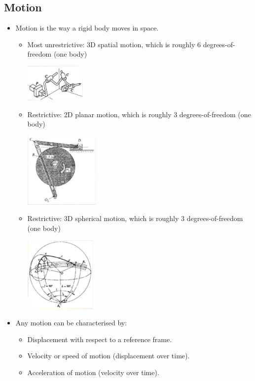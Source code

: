 \documentclass[11pt]{article}
\begin{document}
\subsection{Motion}
\label{sec:org8ee8455}
\begin{itemize}
\item Motion is the way a rigid body moves in space.
\begin{itemize}
\item Most unrestrictive: 3D spatial motion, which is roughly 6 degrees-of-freedom (one body)

\begin{center}
\includegraphics[height=5em]{./images/3d-spatial-motion.png}
\end{center}
\item Restrictive: 2D planar motion, which is roughly 3 degrees-of-freedom (one body)

\begin{center}
\includegraphics[height=10em]{./images/2d-planar-motion.png}
\end{center}
\item Restrictive: 3D spherical motion, which is roughly 3 degrees-of-freedom (one body)

\begin{center}
\includegraphics[height=10em]{./images/3d-spherical-motion.png}
\end{center}
\end{itemize}
\item Any motion can be characterised by:
\begin{itemize}
\item Displacement with respect to a reference frame.
\item Velocity or speed of motion (displacement over time).
\item Acceleration of motion (velocity over time).
\end{itemize}
\end{itemize}
\end{document}
